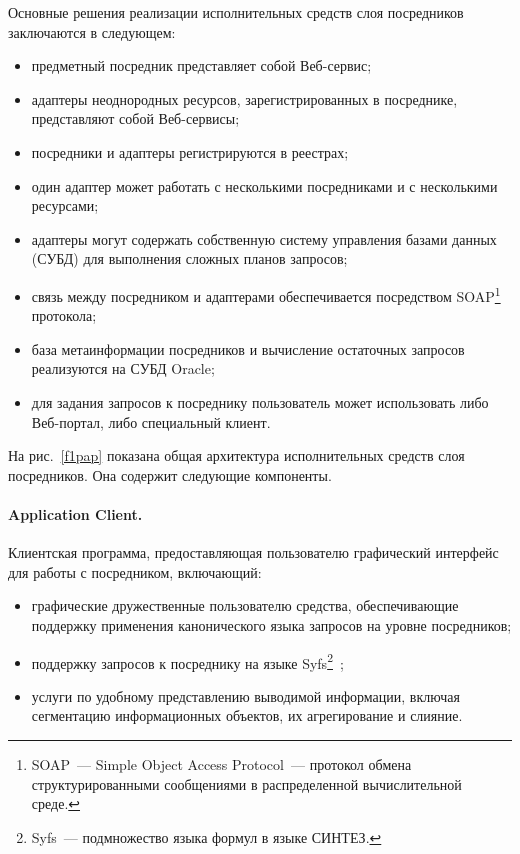 \begin{multicols}{2}
     Основные решения реализации исполнительных средств слоя посредников
заключаются в следующем:
     \begin{itemize}
\item предметный посредник представляет собой Веб-сервис;
\item адаптеры неоднородных ресурсов, зарегистрированных в посреднике,
представляют собой Веб-сервисы;
\item посредники и адаптеры регистрируются в реестрах;
\item один адаптер может работать с несколькими посредниками и с несколькими
ресурсами;
\item адаптеры могут содержать собственную сис\-те\-му управления базами
данных (СУБД) для выполнения сложных планов
запросов;
\item связь между посредником и адаптерами обеспечивается посредством
SOAP\footnote{SOAP~--- Simple Object Access Protocol~--- протокол обмена
структурированными сообщениями в распределенной вычислительной среде.}
протокола;
\item база метаинформации посредников и вычисление остаточных запросов
реализуются на СУБД Oracle;
\item для задания запросов к посреднику пользователь может использовать либо
Веб-портал, либо специальный клиент.
\end{itemize}

На рис.~\ref{f1pap} показана общая архитектура исполнительных средств слоя
посредников. Она содержит следующие компоненты.

\vspace*{-3pt}
\paragraph*{Application Client.} Клиентская программа, предоставляющая пользователю
графический интерфейс для работы с посредником, включающий:
\begin{itemize}
\item графические дружественные пользователю средства, обеспечивающие
поддержку применения канонического языка запросов на уровне посредников;
\item поддержку запросов к посреднику на языке Syfs\footnote{Syfs~--- подмножество
языка формул в языке СИНТЕЗ.}~\cite{KlaStu07};
\item услуги по удобному представлению выводимой информации, включая
сегментацию информационных объектов, их агрегирование и слияние.
\end{itemize}


\end{multicols}
